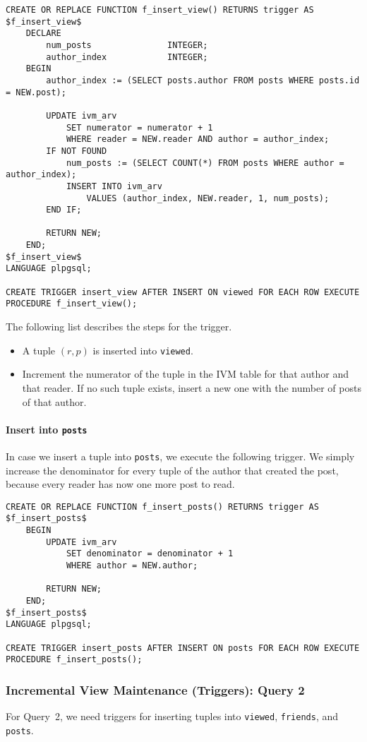 \documentclass[12pt]{article}
\begin{document}
\begin{lstlisting}
CREATE OR REPLACE FUNCTION f_insert_view() RETURNS trigger AS 
$f_insert_view$
	DECLARE
		num_posts				INTEGER;
		author_index			INTEGER;
	BEGIN
		author_index := (SELECT posts.author FROM posts WHERE posts.id = NEW.post);

		UPDATE ivm_arv
			SET numerator = numerator + 1
			WHERE reader = NEW.reader AND author = author_index;
		IF NOT FOUND
			num_posts := (SELECT COUNT(*) FROM posts WHERE author = author_index);
			INSERT INTO ivm_arv
				VALUES (author_index, NEW.reader, 1, num_posts);
		END IF;

		RETURN NEW;
	END;
$f_insert_view$
LANGUAGE plpgsql;

CREATE TRIGGER insert_view AFTER INSERT ON viewed FOR EACH ROW EXECUTE PROCEDURE f_insert_view();
\end{lstlisting}

\noindent The following list describes the steps for the trigger.
\begin{itemize}
	\item A tuple $(r, p)$ is inserted into \lstinline{viewed}.
    \item Increment the numerator of the tuple in the IVM table for that author and that reader. If no such tuple exists, insert a new one with the number of posts of that author.
\end{itemize}

\paragraph{Insert into \lstinline{posts}} In case we insert a tuple into \lstinline{posts}, we execute the following trigger. We simply increase the denominator for every tuple of the author that created the post, because every reader has now one more post to read.

\begin{lstlisting}
CREATE OR REPLACE FUNCTION f_insert_posts() RETURNS trigger AS 
$f_insert_posts$
	BEGIN
		UPDATE ivm_arv
			SET denominator = denominator + 1
			WHERE author = NEW.author;

		RETURN NEW;
	END;
$f_insert_posts$
LANGUAGE plpgsql;

CREATE TRIGGER insert_posts AFTER INSERT ON posts FOR EACH ROW EXECUTE PROCEDURE f_insert_posts();
\end{lstlisting}

\subsubsection{Incremental View Maintenance (Triggers): Query 2}
For Query~2, we need triggers for inserting tuples into \lstinline{viewed}, \lstinline{friends}, and \lstinline{posts}.
\end{document}
